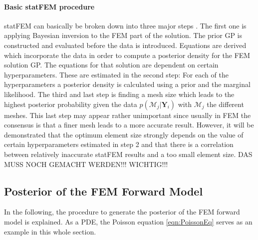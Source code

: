 \documentclass[%
  a4paper,oneside,%
  11pt,%
  smallchapters,
  style=printdev,
  extramargin,
  green,%
  rgb, <cmyk>
  ]{tubsbook}
\begin{document}
\paragraph{Basic statFEM procedure}
statFEM can basically be broken down into three major steps \cite{girolami2021}. The first one is applying Bayesian inversion to the FEM part of the solution. The prior GP is constructed and evaluated before the data is introduced. Equations are derived which incorporate the data in order to compute a posterior density for the FEM solution GP. The equations for that solution are dependent on certain hyperparameters. These are estimated in the second step: For each of the hyperparameters a posterior density is calculated using a prior and the marginal likelihood. The third and last step is finding a mesh size which leads to the highest posterior probability given the data $p(\mathcal{M}_j|\bm{Y}_i)$ with $\mathcal{M}_j$ the different meshes. This last step may appear rather unimportant since usually in FEM the consensus is that a finer mesh leads to a more accurate result. However, it will be demonstrated that the optimum element size strongly depends on the value of certain hyperparameters estimated in step 2 and that there is a correlation between relatively inaccurate statFEM results and a too small element size. DAS MUSS NOCH GEMACHT WERDEN!!! WICHTIG!!!

\subsection{Posterior of the FEM Forward Model}
In the following, the procedure to generate the posterior of the FEM forward model is explained. As a PDE, the Poisson equation \eqref{eqn:PoissonEq} serves as an example in this whole section.
\end{document}
